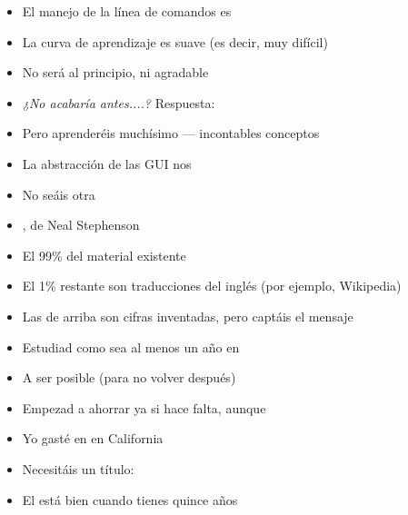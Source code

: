 \documentclass[14pt]{beamer}
\begin{document}

\begin{frame}{}
  \begin{block}{}\centering
    \Large {}
  \end{block}
  \begin{itemize}
    \item El manejo de la línea de comandos es 
    \item La curva de aprendizaje es suave (es decir, muy difícil)
    \item No será  al principio, ni agradable
    \item \emph{¿No acabaría antes....?} Respuesta: 
    \item Pero aprenderéis muchísimo — incontables conceptos
    \item La abstracción de las GUI nos 
    \item No seáis otra 
    \item {}, de  Neal Stephenson
  \end{itemize}
\end{frame}

\begin{frame}{}
  \begin{block}{}\centering
    \Large {}
  \end{block}
  \begin{itemize}
    \item El 99\% del material existente 
    \item El 1\% restante son traducciones del inglés (por ejemplo, Wikipedia)
    \item Las de arriba son cifras inventadas, pero captáis el mensaje
    \item Estudiad como sea al menos un año en 
    \item A ser posible  (para no volver después)
    \item Empezad a ahorrar ya si hace falta, aunque 
    \item Yo gasté  en  en California
    \item Necesitáis un título: 
    \item El  está bien cuando tienes quince años
  \end{itemize}
\end{frame}
\end{document}
